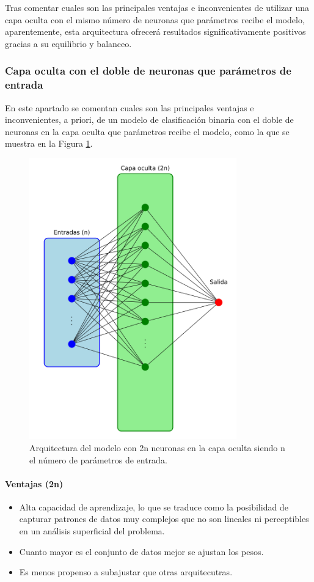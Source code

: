 Tras comentar cuales son las principales ventajas e inconvenientes de utilizar una capa oculta con el mismo número de neuronas que parámetros recibe el modelo, aparentemente, esta arquitectura ofrecerá resultados significativamente positivos gracias a su equilibrio y balanceo.

\subsubsection{Capa oculta con el doble de neuronas que parámetros de entrada}\label{sec:VIBIN98}
En este apartado se comentan cuales son las principales ventajas e inconvenientes, a priori, de un modelo de clasificación binaria con el doble de neuronas en la capa oculta que parámetros recibe el modelo, como la que se muestra en la Figura \ref{fig:arqnnBIN}.

\begin{figure}[H]
    \centering
    \includegraphics[width=0.8\textwidth]{./img/modelo/arqnnBIN.pdf}
    \caption{Arquitectura del modelo con 2n neuronas en la capa oculta siendo n el número de parámetros de entrada.}
    \label{fig:arqnnBIN}
\end{figure}

\paragraph{Ventajas (2n)}
\begin{itemize}
	\item Alta capacidad de aprendizaje, lo que se traduce como la posibilidad de capturar patrones de datos muy complejos que no son lineales ni perceptibles en un análisis superficial del problema.
	\item Cuanto mayor es el conjunto de datos mejor se ajustan los pesos.
	\item Es menos propenso a subajustar que otras arquitecutras.
\end{itemize}
